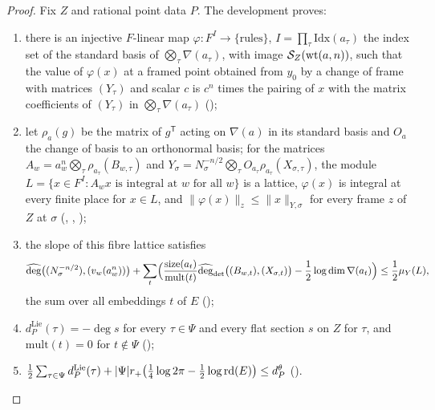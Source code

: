 \begin{proof}
Fix $Z$ and rational point data $P$. The development proves:
\begin{enumerate}[label=(\roman*)]
\item\label{pf:lift1:fib1} there is an injective $F$-linear map
  $\varphi\colon F^{I}\to\{\text{rules}\}$, $I=\prod_\tau\mathrm{Idx}(a_\tau)$ the index set of the
  standard basis of $\bigotimes_\tau\nabla(a_\tau)$, with image $\mathcal S_Z(\mathrm{wt}(a,n))$, such
  that the value of $\varphi(x)$ at a framed point obtained from $y_0$ by a change of frame with
  matrices $(Y_\tau)$ and scalar $c$ is $c^n$ times the pairing of $x$ with the matrix coefficients of
  $(Y_\tau)$ in $\bigotimes_\tau\nabla(a_\tau)$
  ();
\item\label{pf:lift1:fib2} let $\rho_a(g)$ be the matrix of $g^{\mathsf T}$ acting on $\nabla(a)$ in its
  standard basis and $O_a$ the change of basis to an orthonormal basis; for the matrices
  $A_w=a_w^n\bigotimes_\tau\rho_{a_\tau}(B_{w,\tau})$ and
  $Y_\sigma=N_\sigma^{-n/2}\bigotimes_\tau O_{a_\tau}\rho_{a_\tau}(X_{\sigma,\tau})$, the module
  $L=\{x\in F^I:A_wx\text{ is integral at }w\text{ for all }w\}$ is a lattice, $\varphi(x)$ is integral
  at every finite place for $x\in L$, and $\|\varphi(x)\|_z\le\|x\|_{Y,\sigma}$ for every frame $z$ of $Z$
  at $\sigma$ (,
  ,
  );
\item\label{pf:lift1:fib3} the slope of this fibre lattice satisfies
  \[
  \widehat{\deg}\bigl((N_\sigma^{-n/2}),(v_w(a_w^n))\bigr)+\sum_{t}\Bigl(\frac{\mathrm{size}(a_t)}{\mathrm{mult}(t)}
  \widehat{\deg}_{\det}\bigl((B_{w,t}),(X_{\sigma,t})\bigr)-\frac12\log\dim\nabla(a_t)\Bigr)\le\frac12\mu_Y(L),
  \]
  the sum over all embeddings $t$ of $E$ ();
\item\label{pf:lift1:fib4} $d^{\mathrm{Lie}}_P(\tau)=-\deg s$ for every $\tau\in\Psi$ and every flat
  section $s$ on $Z$ for $\tau$, and $\mathrm{mult}(t)=0$ for $t\notin\Psi$
  ();
\item\label{pf:lift1:fib5} $\frac12\sum_{\tau\in\Psi}d^{\mathrm{Lie}}_P(\tau)+|\Psi|r_+\bigl(\frac14\log2\pi
  -\frac12\log\mathrm{rd}(E)\bigr)\le d^{\theta}_P$
  ().

\end{enumerate}
\end{proof}
